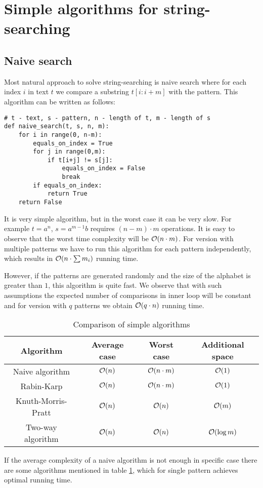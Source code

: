 \section{Simple algorithms for string-searching}

\subsection{Naive search}
Most natural approach to solve string-searching is naive search where for each index $i$ in text $t$ we compare a substring $t[i : i+m]$ with the pattern. This algorithm can be written as follows:
\begin{verbatim}
# t - text, s - pattern, n - length of t, m - length of s
def naive_search(t, s, n, m):
    for i in range(0, n-m):
        equals_on_index = True
        for j in range(0,m):
            if t[i+j] != s[j]:
                equals_on_index = False
                break
        if equals_on_index:
            return True
    return False
\end{verbatim}
It is very simple algorithm, but in the worst case it can be very slow. For example $t = a^n$, $s = a^{m-1}b$ requires $(n-m) \cdot m$ operations. It is easy to observe that the worst time complexity will be $\mathcal{O} (n \cdot m)$. For version with multiple patterns we have to run this algorithm for each pattern independently, which results in $\mathcal{O}(n \cdot \sum m_i)$ running time. \newline

However, if the patterns are generated randomly and the size of the alphabet is greater than $1$, this algorithm is quite fast. We observe that with such assumptions the expected number of comparisons in inner loop will be constant and for version with $q$ patterns we obtain $\mathcal{O}(q \cdot n)$ running time. 
\newline
\begin{table}[!htb]
\begin{center}
\caption{Comparison of simple algorithms}
\label{table:simpleAlgos}
\begin{tabular}{|c|c|c|c|}
\hline
\rowcolor[HTML]{C0C0C0} 
Algorithm          & Average case & Worst case & Additional space \\ \hline
Naive algorithm    & $\mathcal{O}(n)$       & $\mathcal{O}(n\cdot m)$     & $\mathcal{O}(1)$           \\ \hline
Rabin-Karp \cite{rabinKarp}        & $\mathcal{O}(n)$       & $\mathcal{O}(n\cdot m)$     & $\mathcal{O}(1)$           \\ \hline
Knuth-Morris-Pratt \cite{KMP} & $\mathcal{O}(n)$       & $\mathcal{O}(n)$     & $\mathcal{O}(m)$           \\ \hline
Two-way algorithm \cite{twoWayAlgo}  & $\mathcal{O}(n)$         & $\mathcal{O}(n)$       & $\mathcal{O}(\log m)$       \\ \hline
\end{tabular}
\end{center}
\end{table}

If the average complexity of a naive algorithm is not enough in specific case there are some algorithms mentioned in table \ref{table:simpleAlgos}, which for single pattern achieves optimal running time.
